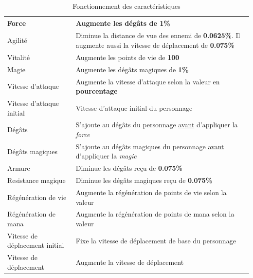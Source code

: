 \documentclass[11pt, a4paper, oneside]{report}
\begin{document}
\begin{table}[ht]
\begin{center}
\begin{tabularx}{\textwidth}{| l | Y |}
  \hline                     
  Force 				& Augmente les dégâts de \textbf{1\%}\\ \hline
  Agilité 				& Diminue la distance de vue des ennemi de \textbf{0.0625\%}. Il augmente aussi la vitesse de déplacement de \textbf{0.075\%} \\ \hline
  Vitalité 				& Augmente les points de vie de \textbf{100} \\ \hline
  Magie 				& Augmente les dégâts magiques de \textbf{1\%} \\ \hline
  Vitesse d'attaque 	& Augmente la vitesse d'attaque selon la valeur en \textbf{pourcentage} \\ \hline
  Vitesse d'attaque initial	& Vitesse d'attaque initial du personnage\\ \hline
  Dégâts 				& S'ajoute au dégâts du personnage \underline{avant} d'appliquer la \emph{force} \\ \hline
  Dégâts magiques 		& S'ajoute au dégâts magiques du personnage \underline{avant} d'appliquer la \emph{magie} \\ \hline
  Armure 				& Diminue les dégâts reçu de \textbf{0.075\%} \\ \hline
  Resistance magique 	& Diminue les dégâts magiques reçu de \textbf{0.075\%} \\ \hline
  Régénération de vie 	& Augmente la régénération de points de vie selon la valeur\\ \hline
  Régénération de mana 	& Augmente la régénération de points de mana selon la valeur\\ \hline
  Vitesse de déplacement initial& Fixe la vitesse de déplacement de base du personnage\\ \hline
  Vitesse de déplacement& Augmente la vitesse de déplacement\\ \hline
\end{tabularx}
\caption{Fonctionnement des caractéristiques}
\end{center}
\end{table}
\end{document}
